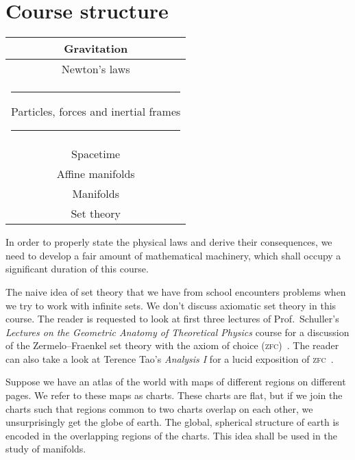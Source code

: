 \documentclass[a4 paper, 12pt]{book}
\theoremstyle{definition}
\begin{document}
    \section{Course structure}

    \begin{center}
        \renewcommand{\arraystretch}{1.3}
        \begin{tabular}{|c|}
            \hline
            Gravitation\\
            \hline
            Newton's laws\\
            \hline
            \rule{5pt}{0pt}Particles, forces and inertial frames\rule{5pt}{0pt}\\
            \hline
            Spacetime\\
            \hline
            Affine manifolds\\
            \hline
            Manifolds\\
            \hline
            Set theory\\
            \hline
        \end{tabular}
    \end{center}

    In order to properly state the physical laws and derive their consequences, we need to develop a fair amount of mathematical machinery, which shall occupy a significant duration of this course.

    The naive idea of set theory that we have from school encounters problems when we try to work with infinite sets. We don't discuss axiomatic set theory in this course. The reader is requested to look at first three lectures of Prof.\ Schuller's \textit{Lectures on the Geometric Anatomy of Theoretical Physics} course for a discussion of the Zermelo--Fraenkel set theory with the axiom of choice (\textsc{zfc})~\cite{Schuller_geometric_videos}. The reader can also take a look at Terence Tao's \textit{Analysis I} for a lucid exposition of \textsc{zfc}~\cite{Tao}.

    Suppose we have an atlas of the world with maps of different regions on different pages. We refer to these maps as charts. These charts are flat, but if we join the charts such that regions common to two charts overlap on each other, we unsurprisingly get the globe of earth. The global, spherical structure of earth is encoded in the overlapping regions of the charts. This idea shall be used in the study of manifolds.
\end{document}
